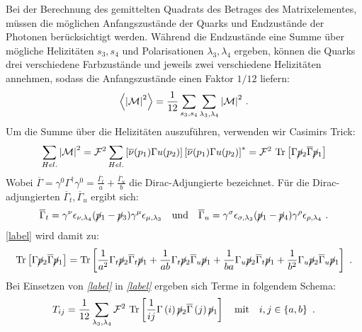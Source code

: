 Bei der Berechnung des gemittelten Quadrats des Betrages des Matrixelementes, müssen die möglichen Anfangszustände der Quarks und Endzustände der Photonen berücksichtigt werden. Während die Endzustände eine Summe über mögliche Helizitäten $s_3, s_4$ und Polarisationen $\lambda_3, \lambda_4$ ergeben, können die Quarks drei verschiedene Farbzustände und jeweils zwei verschiedene Helizitäten annehmen, sodass die Anfangszustände einen Faktor $1/12$ liefern:
\begin{equation}
\left\langle  \abs{\mathcal{M}}^2\right\rangle = \frac{1}{12} \sum_{s_3, s_4} \sum_{\lambda_3, \lambda_4} \abs{\mathcal{M}}^2~.
\end{equation}
Um die Summe über die Helizitäten auszuführen, verwenden wir Casimirs Trick:
\begin{equation}
\sum_{Hel.} \abs{\mathcal{M}}^2 = \mathcal{F}^2 \sum_{Hel.}  \left[ \overline{\nu}(p_1) \Gamma u(p_2)\right] \left[\overline{\nu}(p_1) \Gamma u(p_2)\right]^* = \mathcal{F}^2~\text{Tr}\left[ \Gamma \cancel{p}_2 \overline{\Gamma} \cancel{p}_1 \right]
\end{equation}
Wobei $\overline{\Gamma} = \gamma^0\Gamma^\dagger\gamma^0 = \frac{\overline{\Gamma}_t}{a} + \frac{\overline{\Gamma}_u}{b}$ die Dirac-Adjungierte bezeichnet. Für die Dirac-adjungierten $\overline{\Gamma}_t, \overline{\Gamma}_u$ ergibt sich:
\begin{equation}
\overline{\Gamma}_t = \gamma^\nu  \epsilon_{\nu, \lambda_4} (\cancel{p}_1- \cancel{p}_3)  \gamma^\mu \epsilon_{\mu, \lambda_3} \quad \text{und} \quad \overline{\Gamma}_u = \gamma^\sigma \epsilon_{\sigma, \lambda_3} (\cancel{p}_1- \cancel{p}_4)  \gamma^\rho \epsilon_{\rho, \lambda_4} ~.
\end{equation}
\autoref{label} wird damit zu:
\begin{equation}
\text{Tr}\left[ \Gamma \cancel{p}_2 \overline{\Gamma} \cancel{p}_1 \right] = \text{Tr}\left[\frac{1}{a^2} \Gamma_t \cancel{p}_2 \overline{\Gamma}_t \cancel{p}_1 + \frac{1}{ab} \Gamma_t \cancel{p}_2 \overline{\Gamma}_u \cancel{p}_1 + \frac{1}{ba} \Gamma_u \cancel{p}_2 \overline{\Gamma}_t \cancel{p}_1 + \frac{1}{b^2} \Gamma_u \cancel{p}_2 \overline{\Gamma}_u \cancel{p}_1\right]~.
\end{equation}
Bei Einsetzen von \textit{\autoref{label}} in \textit{\autoref{label}} ergeben sich Terme in folgendem Schema:
\begin{equation}
T_{ij} = \frac{1}{12} \sum_{\lambda_3, \lambda_4} \mathcal{F}^2~\text{Tr}\left[ \frac{1}{ij} \Gamma\left(i\right) \cancel{p}_2 \overline{\Gamma}\left(j\right) \cancel{p}_1 \right] \quad \text{mit} \quad i,j \in \left\lbrace a,b\right\rbrace~.
\end{equation}
